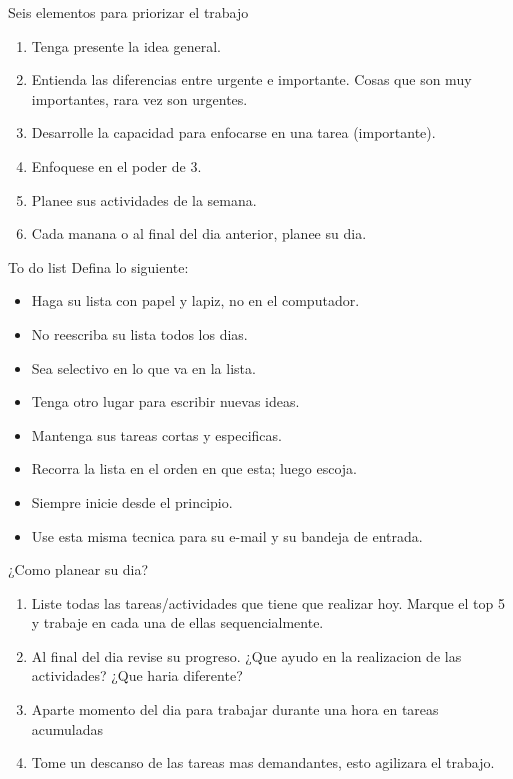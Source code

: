 \documentclass[
10pt,
aspectratio=169,
]{beamer}
\begin{document}
\begin{frame}[c]{Seis elementos para priorizar el trabajo}
\begin{enumerate}
\item Tenga presente la idea general.
\item Entienda las diferencias entre urgente e importante. Cosas que son muy importantes, rara vez son urgentes.
\item Desarrolle la capacidad para enfocarse en una tarea (importante).
\item Enfoquese en el poder de 3.
\item Planee sus actividades de la semana.
\item Cada manana o al final del dia anterior, planee su dia.  
\end{enumerate}
\end{frame}

\begin{frame}[c]{To do list}
Defina lo siguiente:
\begin{itemize}
\item Haga su lista con papel y lapiz, no en el computador.
\item No reescriba su lista todos los dias.
\item Sea selectivo en lo que va en la lista.
\item Tenga otro lugar para escribir nuevas ideas.
\item Mantenga sus tareas cortas y especificas.
\item Recorra la lista en el orden en que esta; luego escoja.
\item Siempre inicie desde el principio.
\item Use esta misma tecnica para su e-mail y su bandeja de entrada. 
\end{itemize}
\end{frame}

\begin{frame}[c]{¿Como planear su dia?}
\begin{enumerate}
\item Liste todas las tareas/actividades que tiene que realizar hoy. Marque el top 5 y trabaje en cada una de ellas sequencialmente. 
\item Al final del dia revise su progreso. ¿Que ayudo en la realizacion de las actividades? ¿Que haria diferente?
\item Aparte momento del dia para trabajar durante una hora en tareas acumuladas
\item Tome un descanso de las tareas mas demandantes, esto agilizara el trabajo. 
\end{enumerate}
\end{frame}
\end{document}
